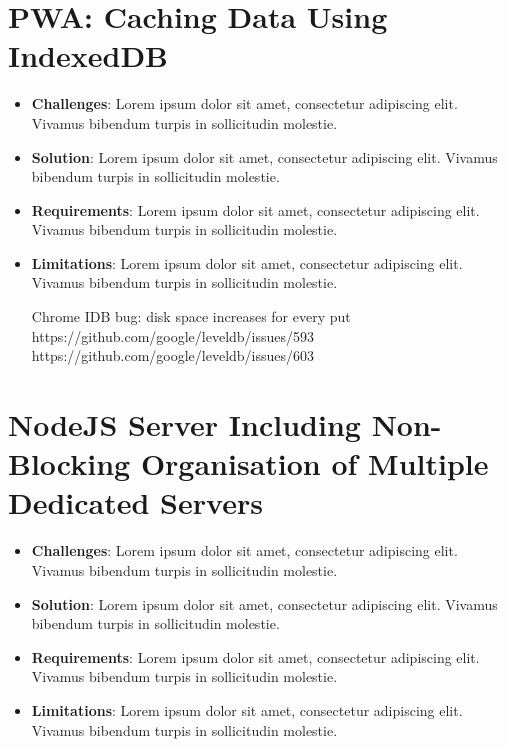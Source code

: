 \documentclass[11pt, a4paper]{article}
\begin{document}
\section{PWA: Caching Data Using IndexedDB}
\begin{itemize}
  \item \textbf{Challenges}: Lorem ipsum dolor sit amet, consectetur adipiscing elit. Vivamus
  bibendum turpis in sollicitudin molestie.
  \item \textbf{Solution}: Lorem ipsum dolor sit amet, consectetur adipiscing elit. Vivamus bibendum
  turpis in sollicitudin molestie.
  \item \textbf{Requirements}: Lorem ipsum dolor sit amet, consectetur adipiscing elit. Vivamus
  bibendum turpis in sollicitudin molestie.
  \item \textbf{Limitations}: Lorem ipsum dolor sit amet, consectetur adipiscing elit. Vivamus
  bibendum turpis in sollicitudin molestie.

  Chrome IDB bug: disk space increases for every put
  https://github.com/google/leveldb/issues/593
  https://github.com/google/leveldb/issues/603
\end{itemize}

\section{NodeJS Server Including Non-Blocking Organisation of Multiple Dedicated Servers}
\begin{itemize}
  \item \textbf{Challenges}: Lorem ipsum dolor sit amet, consectetur adipiscing elit. Vivamus
  bibendum turpis in sollicitudin molestie.
  \item \textbf{Solution}: Lorem ipsum dolor sit amet, consectetur adipiscing elit. Vivamus bibendum
  turpis in sollicitudin molestie.
  \item \textbf{Requirements}: Lorem ipsum dolor sit amet, consectetur adipiscing elit. Vivamus
  bibendum turpis in sollicitudin molestie.
  \item \textbf{Limitations}: Lorem ipsum dolor sit amet, consectetur adipiscing elit. Vivamus
  bibendum turpis in sollicitudin molestie.
\end{itemize}
\end{document}

